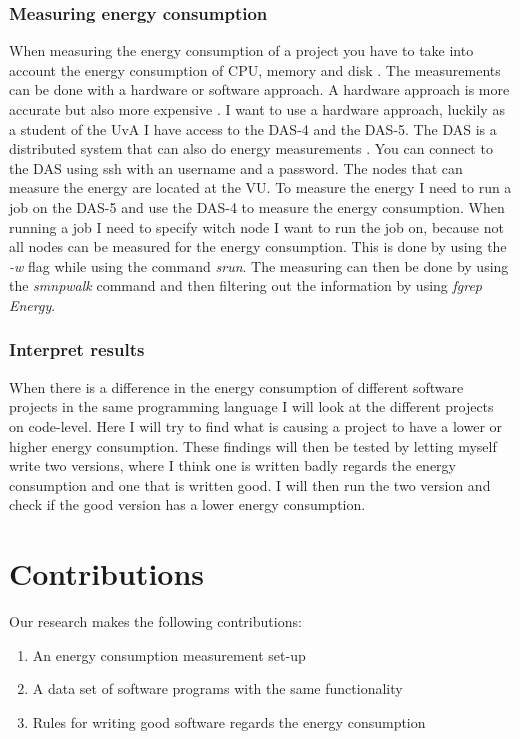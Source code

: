 \subsubsection{Measuring energy consumption}
When measuring the energy consumption of a project you have to take into account the energy consumption of CPU, memory and disk \cite{acar2016impact}. The measurements can be done with a hardware or software approach. A hardware approach is more accurate but also more expensive \cite{acar2016impact}. I want to use a hardware approach, luckily as a student of the UvA I have access to the DAS-4 and the DAS-5. The DAS is a distributed system that can also do energy measurements \cite{bal2016medium}. You can connect to the DAS using ssh with an username and a password. The nodes that can measure the energy are located at the VU. To measure the energy I need to run a job on the DAS-5 and use the DAS-4 to measure the energy consumption. When running a job I need to specify witch node I want to run the job on, because not all nodes can be measured for the energy consumption. This is done by using the \textit{-w} flag while using the command \textit{srun}. The measuring can then be done by using the \textit{smnpwalk} command and then filtering out the information by using \textit{fgrep Energy}.

\subsubsection{Interpret results}
When there is a difference in the energy consumption of different software projects in the same programming language I will look at the different projects on code-level. Here I will try to find what is causing a project to have a lower or higher energy consumption. These findings will then be tested by letting myself write two versions, where I think one is written badly regards the energy consumption and one that is written good. I will then run the two version and check if the good version has a lower energy consumption.

\section{Contributions}
Our research makes the following contributions:
\begin{enumerate}
	\item An energy consumption measurement set-up
	\item A data set of software programs with the same functionality
	\item Rules for writing good software regards the energy consumption
\end{enumerate}


